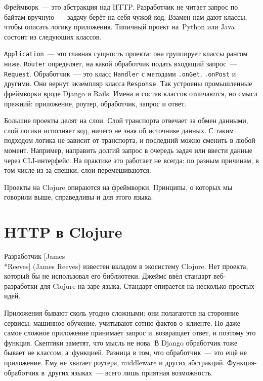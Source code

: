 Фреймворк~--- это абстракция над HTTP. Разработчик не читает запрос по байтам
вручную~--- задачу берёт на себя чужой код. Взамен нам дают классы, чтобы
описать логику приложения. Типичный проект на~Python или Java состоит из
следующих классов.

\verb|Application|~--- это главная сущность проекта: она группирует классы рангом
ниже. \verb|Router| определяет, на какой обработчик подать входящий запрос~---
\verb|Request|. Обработчик~--- это класс \verb|Handler| с методами
\verb|.onGet|, \verb|.onPost| и другими. Они вернут экземпляр класса
\verb|Response|. Так устроены промышленные фреймворки вроде Django и
Rails. Имена и состав классов отличаются, но смысл прежний: приложение, роутер,
обработчик, запрос и ответ.


Большие проекты делят на слои. Слой транспорта отвечает за обмен данными, слой
логики исполняет код, ничего не зная об источнике данных. С таким подходом
логика не зависит от транспорта, и последний можно сменить в любой
момент. Например, направить долгий запрос в очередь задач или ввести данные
через CLI-интерфейс. На практике это работает не всегда: по разным причинам, в
том числе из-за спешки, слои перемешиваются.

Проекты на Clojure опираются на фреймворки. Принципы, о которых мы говорили
выше, справедливы и для этого языка.

\section{HTTP в Clojure}


Разработчик [James\\*Reeves] (James Reeves)
известен вкладом в экосистему Clojure. Нет проекта, который бы не использовал
его библиотеки. Джеймс ввёл стандарт веб-разработки для Clojure на заре
языка. Стандарт опирается на несколько простых идей.

Приложения бывают сколь угодно сложными: они полагаются на сторонние сервисы,
машинное обучение, учитывают сотню фактов о~клиенте. Но даже самое сложное
приложение принимает запрос и~возвращает ответ, и поэтому это функция. Скептики
заметят, что мысль не нова. В Django обработчик тоже бывает не классом,
а~функцией. Разница в том, что обработчик~--- это ещё не приложение. Ему не
хватает роутера, middleware и других абстракций. Функция-обработчик в~других
языках~--- всего лишь приятная возможность.

